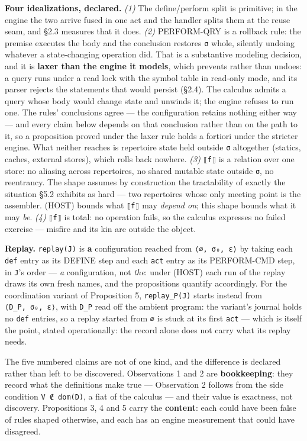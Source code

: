 \documentclass[
]{article}
\begin{document}
\textbf{Four idealizations, declared.} \emph{(1)} The define/perform
split is primitive; in the engine the two arrive fused in one act and
the handler splits them at the reuse seam, and §2.3 measures that it
does. \emph{(2)} PERFORM-QRY is a rollback rule: the premise executes
the body and the conclusion restores \texttt{σ} whole, silently undoing
whatever a state-changing operation did. That is a substantive modeling
decision, and it is \textbf{laxer than the engine it models}, which
prevents rather than undoes: a query runs under a read lock with the
symbol table in read-only mode, and its parser rejects the statements
that would persist (§2.4). The calculus admits a query whose body would
change state and unwinds it; the engine refuses to run one. The rules'
conclusions agree --- the configuration retains nothing either way ---
and every claim below depends on that conclusion rather than on the path
to it, so a proposition proved under the laxer rule holds a fortiori
under the stricter engine. What neither reaches is repertoire state held
outside \texttt{σ} altogether (statics, caches, external stores), which
rolls back nowhere. \emph{(3)} \texttt{⟦f⟧} is a relation over one
store: no aliasing across repertoires, no shared mutable state outside
\texttt{σ}, no reentrancy. The shape assumes by construction the
tractability of exactly the situation §5.2 exhibits as hard --- two
repertoires whose only meeting point is the assembler. (HOST) bounds
what \texttt{⟦f⟧} may \emph{depend on}; this shape bounds what it may
\emph{be}. \emph{(4)} \texttt{⟦f⟧} is total: no operation fails, so the
calculus expresses no failed exercise --- misfire and its kin are
outside the object.

\textbf{Replay.} \texttt{replay(J)} is \textbf{a} configuration reached
from \texttt{⟨∅,\ σ₀,\ ε⟩} by taking each \texttt{def} entry as its
DEFINE step and each \texttt{act} entry as its PERFORM-CMD step, in
\texttt{J}'s order --- \emph{a} configuration, not \emph{the}: under
(HOST) each run of the replay draws its own fresh names, and the
propositions quantify accordingly. For the coordination variant of
Proposition 5, \texttt{replay\_P(J)} starts instead from
\texttt{⟨D\_P,\ σ₀,\ ε⟩}, with \texttt{D\_P} read off the ambient
program: the variant's journal holds no \texttt{def} entries, so a
replay started from \texttt{∅} is stuck at its first \texttt{act} ---
which is itself the point, stated operationally: the record alone does
not carry what its replay needs.

The five numbered claims are not of one kind, and the difference is
declared rather than left to be discovered. Observations 1 and 2 are
\textbf{bookkeeping}: they record what the definitions make true ---
Observation 2 follows from the side condition \texttt{V\ ∉\ dom(D)}, a
fiat of the calculus --- and their value is exactness, not discovery.
Propositions 3, 4 and 5 carry the \textbf{content}: each could have been
false of rules shaped otherwise, and each has an engine measurement that
could have disagreed.
\end{document}
